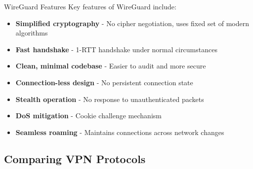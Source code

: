 \begin{theorem}{WireGuard Features}
Key features of WireGuard include:
\begin{itemize}
    \item \textbf{Simplified cryptography} - No cipher negotiation, uses fixed set of modern algorithms
    \item \textbf{Fast handshake} - 1-RTT handshake under normal circumstances
    \item \textbf{Clean, minimal codebase} - Easier to audit and more secure
    \item \textbf{Connection-less design} - No persistent connection state
    \item \textbf{Stealth operation} - No response to unauthenticated packets
    \item \textbf{DoS mitigation} - Cookie challenge mechanism
    \item \textbf{Seamless roaming} - Maintains connections across network changes
\end{itemize}
\end{theorem}


\subsection{Comparing VPN Protocols}

